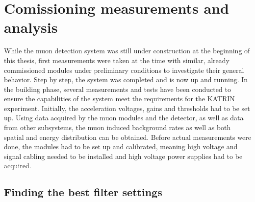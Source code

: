 %

\chapter{Comissioning measurements and analysis}
\label{ch:Analysis}

  While the muon detection system was still under construction at the beginning of this thesis, first measurements were taken at the time with similar, already commissioned modules under preliminary conditions to investigate their general behavior. Step by step, the system was completed and is now up and running. In the building phase, several measurements and tests have been conducted to ensure the capabilities of the system meet the requirements for the KATRIN experiment. Initially, the acceleration voltages, gains and thresholds had to be set up.
  Using data acquired by the muon modules and the detector, as well as data from other subsystems, the muon induced background rates as well as both spatial and energy distribution can be obtained. Before actual measurements were done, the modules had to be set up and calibrated, meaning high voltage and signal cabling needed to be installed and high voltage power supplies had to be acquired.
   
  
  
  
  \section{Finding the best filter settings}
  \label{ch:Analysis:sec:Finding the best filter settings}
 
